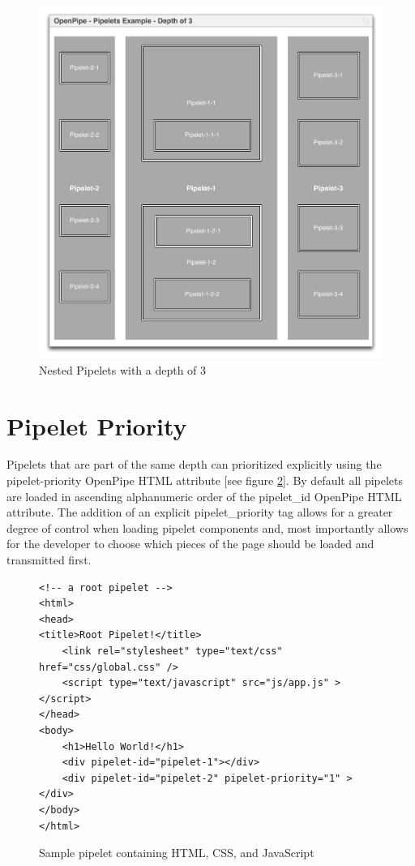 \documentclass[12pt]{report}
\begin{document}
\begin{figure}[H]
\label{fig:nestedPipelets}
\centering
\includegraphics[width=\textwidth,keepaspectratio]{figures/images/nested_pipelets.pdf}
\caption{Nested Pipelets with a depth of 3}
\end{figure}

\section{Pipelet Priority}
Pipelets that are part of the same depth can prioritized explicitly using the pipelet-priority OpenPipe HTML attribute [see figure \ref{fig:pipeletPriority}]. By default all pipelets are loaded in ascending alphanumeric order of the pipelet\_id OpenPipe HTML attribute. The addition of an explicit pipelet\_priority tag allows for a greater degree of control when loading pipelet components and, most importantly allows for the developer to choose which pieces of the page should be loaded and transmitted first.

\begin{figure}[H]
\label{fig:pipeletPriority}
\begin{lstlisting}
<!-- a root pipelet -->
<html>
<head>
<title>Root Pipelet!</title>
	<link rel="stylesheet" type="text/css" href="css/global.css" />
	<script type="text/javascript" src="js/app.js" ></script>
</head>
<body>
	<h1>Hello World!</h1>
	<div pipelet-id="pipelet-1"></div>
	<div pipelet-id="pipelet-2" pipelet-priority="1" ></div>
</body>
</html>
\end{lstlisting}
\caption{Sample pipelet containing HTML, CSS, and JavaScript}
\end{figure}
\end{document}
